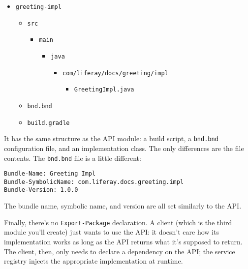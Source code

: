 \begin{itemize}
\tightlist
\item
  \texttt{greeting-impl}

  \begin{itemize}
  \tightlist
  \item
    \texttt{src}

    \begin{itemize}
    \tightlist
    \item
      \texttt{main}

      \begin{itemize}
      \tightlist
      \item
        \texttt{java}

        \begin{itemize}
        \tightlist
        \item
          \texttt{com/liferay/docs/greeting/impl}

          \begin{itemize}
          \tightlist
          \item
            \texttt{GreetingImpl.java}
          \end{itemize}
        \end{itemize}
      \end{itemize}
    \end{itemize}
  \item
    \texttt{bnd.bnd}
  \item
    \texttt{build.gradle}
  \end{itemize}
\end{itemize}

It has the same structure as the API module: a build script, a
\texttt{bnd.bnd} configuration file, and an implementation class. The
only differences are the file contents. The \texttt{bnd.bnd} file is a
little different:

\begin{verbatim}
Bundle-Name: Greeting Impl
Bundle-SymbolicName: com.liferay.docs.greeting.impl
Bundle-Version: 1.0.0
\end{verbatim}

The bundle name, symbolic name, and version are all set similarly to the
API.

Finally, there's no \texttt{Export-Package} declaration. A client (which
is the third module you'll create) just wants to use the API: it doesn't
care how its implementation works as long as the API returns what it's
supposed to return. The client, then, only needs to declare a dependency
on the API; the service registry injects the appropriate implementation
at runtime.

